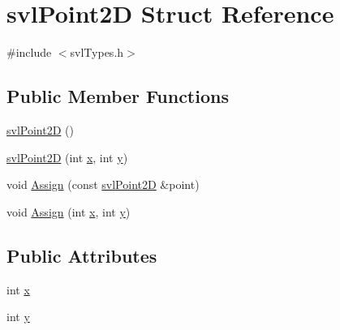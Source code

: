 \hypertarget{structsvl_point2_d}{\section{svl\-Point2\-D Struct Reference}
\label{structsvl_point2_d}
}


{\ttfamily \#include $<$svl\-Types.\-h$>$}

\subsection*{Public Member Functions}
\begin{DoxyCompactItemize}
\item 
\hyperlink{structsvl_point2_d_a363ae27c4d8c6b059fa6459b1ad0f72e}{svl\-Point2\-D} ()
\item 
\hyperlink{structsvl_point2_d_a44bfe06daf764334bb1799a74b90240e}{svl\-Point2\-D} (int \hyperlink{structsvl_point2_d_a6993df11112bf2ed7acaf97215988ba7}{x}, int \hyperlink{structsvl_point2_d_a64c9c29fe5dda7ff0e2c956fc227e6c9}{y})
\item 
void \hyperlink{structsvl_point2_d_aa5a421b6bded7218a86b0523e98c3d65}{Assign} (const \hyperlink{structsvl_point2_d}{svl\-Point2\-D} \&point)
\item 
void \hyperlink{structsvl_point2_d_a53b57929e003c8a6a5fd6caba36493a8}{Assign} (int \hyperlink{structsvl_point2_d_a6993df11112bf2ed7acaf97215988ba7}{x}, int \hyperlink{structsvl_point2_d_a64c9c29fe5dda7ff0e2c956fc227e6c9}{y})
\end{DoxyCompactItemize}
\subsection*{Public Attributes}
\begin{DoxyCompactItemize}
\item 
int \hyperlink{structsvl_point2_d_a6993df11112bf2ed7acaf97215988ba7}{x}
\item 
int \hyperlink{structsvl_point2_d_a64c9c29fe5dda7ff0e2c956fc227e6c9}{y}
\end{DoxyCompactItemize}


